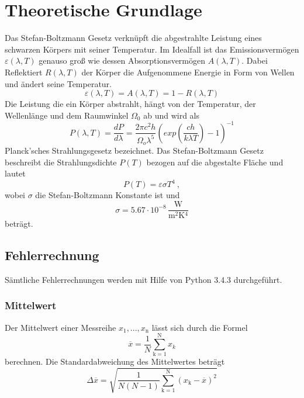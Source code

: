\section{Theoretische Grundlage}
\label{sec:Theorie}
Das Stefan-Boltzmann Gesetz verknüpft die abgestrahlte Leistung eines schwarzen Körpers mit seiner Temperatur. Im Idealfall ist das Emissionsvermögen $\varepsilon(\lambda, T)$ genauso groß wie dessen Absorptionsvermögen $A(\lambda, T)$. Dabei Reflektiert $R(\lambda,T)$ der Körper die Aufgenommene Energie in Form von Wellen und ändert seine Temperatur.
\begin{equation}
  \varepsilon(\lambda, T) = A(\lambda, T) = 1-R(\lambda, T)
  \label{eqn:emission}
\end{equation}
Die Leistung die ein Körper abstrahlt, hängt von der Temperatur, der Wellenlänge und dem Raumwinkel $\Omega_0$ ab und wird als
\begin{equation}
  P(\lambda, T) = \frac{dP}{d \lambda} = \frac{2 \pi c^2 h}{\Omega_o \lambda^5}\left( exp\left( \frac{c h}{k \lambda T} \right) -1 \right)^{-1}
  \label{eqn:planck}
\end{equation}
Planck'sches Strahlungsgesetz bezeichnet.
Das Stefan-Boltzmann Gesetz beschreibt die Strahlungsdichte $P(T)$ bezogen auf die abgestalte Fläche und lautet
\begin{equation}
  P(T) = \varepsilon \sigma T^4 \ ,
  \label{eqn:strahlungsgesetz}
\end{equation}
wobei $\sigma$ die Stefan-Boltzmann Konstante ist und
\begin{equation}
  \sigma = 5.67 \cdot 10^{-8} \, \frac{\text{W}}{\text{m$^2$K$^4$}}
\end{equation}
beträgt.
\subsection{Fehlerrechnung}
Sämtliche Fehlerrechnungen werden mit Hilfe von Python 3.4.3 durchgeführt.
\subsubsection{Mittelwert}
Der Mittelwert einer Messreihe $x_\text{1}, ... ,x_\text{n}$ lässt sich durch die Formel
\begin{equation}
	\overline{x} = \frac{1}{N} \sum_{\text{k}=1}^\text{N} x_k
	\label{eqn:ave}
\end{equation}
berechnen. Die Standardabweichung des Mittelwertes beträgt
\begin{equation}
	\Delta \overline{x} = \sqrt{ \frac{1}{N(N-1)} \sum_{\text{k}=1}^\text{N} (x_\text{k} - \overline{x})^2}
	\label{eqn:std}
\end{equation}
